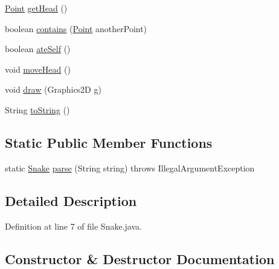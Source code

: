 \begin{DoxyCompactItemize}
\item 
\mbox{\hyperlink{classsnakegame_1_1structs_1_1_point}{Point}} \mbox{\hyperlink{classsnakegame_1_1structs_1_1_snake_a75d7bc3f6202e0159e79b703fdd5232c}{get\+Head}} ()
\item 
boolean \mbox{\hyperlink{classsnakegame_1_1structs_1_1_snake_a3df7436c11ba7bda4154431739778b78}{contains}} (\mbox{\hyperlink{classsnakegame_1_1structs_1_1_point}{Point}} another\+Point)
\item 
boolean \mbox{\hyperlink{classsnakegame_1_1structs_1_1_snake_acefd74708c76a65a7e9f8e5182ae3af3}{ate\+Self}} ()
\item 
void \mbox{\hyperlink{classsnakegame_1_1structs_1_1_snake_a4e147dbd9e7442dce1b4f066946f8959}{move\+Head}} ()
\item 
void \mbox{\hyperlink{classsnakegame_1_1structs_1_1_snake_aefdd30421bce904e5585dbcbec258a98}{draw}} (Graphics2D g)
\item 
String \mbox{\hyperlink{classsnakegame_1_1structs_1_1_snake_a7ebadfc8fb3f4b24d0de3a6b3bde703e}{to\+String}} ()
\end{DoxyCompactItemize}
\subsection*{Static Public Member Functions}
\begin{DoxyCompactItemize}
\item 
static \mbox{\hyperlink{classsnakegame_1_1structs_1_1_snake}{Snake}} \mbox{\hyperlink{classsnakegame_1_1structs_1_1_snake_a5c7858e4b58db59e493b12c18462fb4b}{parse}} (String string)  throws Illegal\+Argument\+Exception 
\end{DoxyCompactItemize}


\subsection{Detailed Description}


Definition at line 7 of file Snake.\+java.



\subsection{Constructor \& Destructor Documentation}
\mbox{\label{classsnakegame_1_1structs_1_1_snake_ae76efb0ea42951d99b3f3e3134622120}} 
